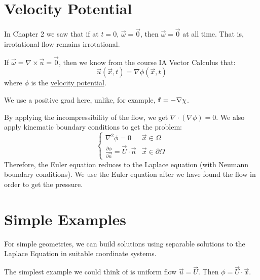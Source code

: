 \documentclass[../Main.tex]{subfiles}
\begin{document}
\section{Velocity Potential}
In Chapter 2 we saw that if at $t = 0$, $\vec{\omega} = \vec0$, then $\vec{\omega} = \vec0$ at all time. That is, irrotational flow remains irrotational.

If $\vec{\omega} = \nabla \times \vec{u} = \vec0$, then we know from the course IA Vector Calculus that:
\begin{equation*}
    \vec{u}(\vec{x}, t) = \nabla \phi(\vec{x}, t)
\end{equation*}
where $\phi$ is the \underline{velocity potential}.
\begin{remark}
    We use a positive grad here, unlike, for example, $\mathbf{f} = - \nabla \chi$.
\end{remark}
By applying the incompressibility of the flow, we get $\nabla \cdot (\nabla \phi) = 0$. We also apply kinematic boundary conditions to get the problem:
\begin{equation}
    \begin{cases}
        \nabla^2 \phi = 0 & \vec{x} \in \Omega \\
        \frac{\partial \phi}{\partial \vec{n}} = \vec{U} \cdot \vec{n} & \vec{x} \in \partial \Omega
    \end{cases}
    \label{eqnPotentialLaplace}
\end{equation}
Therefore, the Euler equation reduces to the Laplace equation (with Neumann boundary conditions). We use the Euler equation after we have found the flow in order to get the pressure.
\section{Simple Examples}
For simple geometries, we can build solutions using separable solutions to the Laplace Equation in suitable coordinate systems.

The simplest example we could think of is uniform flow $\vec{u} = \vec{U}$. Then $\phi = \vec{U} \cdot \vec{x}$.
\end{document}
